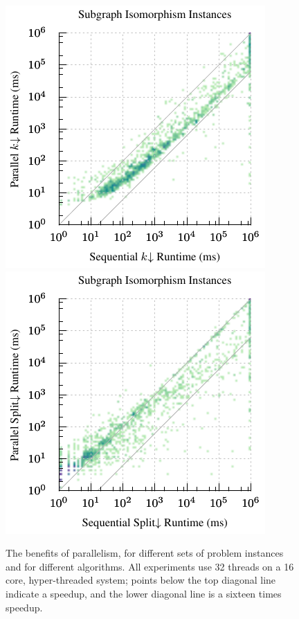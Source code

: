 \documentclass{llncs}
\begin{document}
\begin{figure}[p]
    \vspace*{2em}
    \centering
    \hspace*{0.5em}\includegraphics*[scale=0.7]{plots/sip-par-heatmap-kdown.pdf}\hfill
    \includegraphics*[scale=0.7]{plots/sip-par-heatmap-james.pdf}\hspace*{0.5em}

    \caption{The benefits of parallelism, for different sets of problem instances and for different
    algorithms. All experiments use 32 threads on a 16 core, hyper-threaded system; points below the
    top diagonal line indicate a speedup, and the lower diagonal line is a sixteen times speedup.}
    \label{figure:mcs-par-speedups}
\end{figure}
\end{document}
